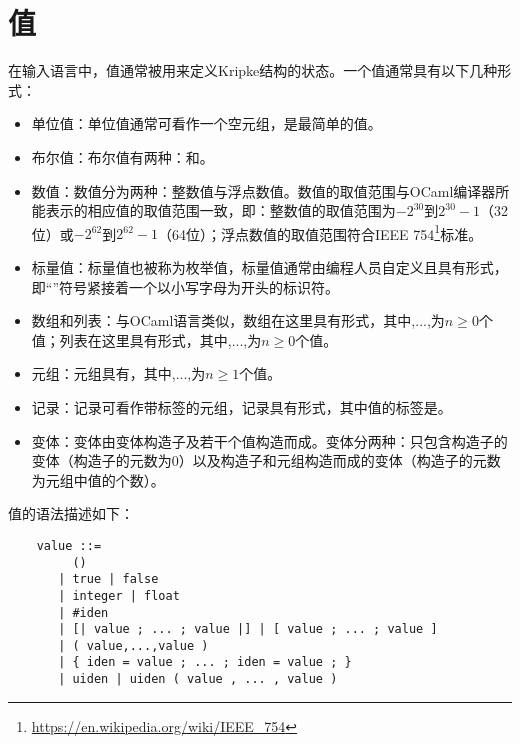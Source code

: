 \section{值}
在输入语言中，值通常被用来定义Kripke结构的状态。一个值通常具有以下几种形式：
\begin{itemize}
	\item 单位值：单位值\code{()}通常可看作一个空元组，是最简单的值。
	\item 布尔值：布尔值有两种：和。
	\item 数值：数值分为两种：整数值与浮点数值。数值的取值范围与OCaml编译器所能表示的相应值的取值范围一致，即：整数值的取值范围为$-2^{30}$到$2^{30}-1$（32位）或$-2^{62}$到$2^{62}-1$（64位）；浮点数值的取值范围符合IEEE 754\footnote{\url{https://en.wikipedia.org/wiki/IEEE_754}}标准。
	\item 标量值：标量值也被称为枚举值，标量值通常由编程人员自定义且具有形式，即“\code{\#}”符号紧接着一个以小写字母为开头的标识符。
	\item 数组和列表：与OCaml语言类似，数组在这里具有\code{[|v1,...,vn|]}形式，其中,...,为$n\ge 0$个值；列表在这里具有\code{[v1,...,vn]}形式，其中,...,为$n\ge 0$个值。
	\item 元组：元组具有，其中,...,为$n\ge 1$个值。
	\item 记录：记录可看作带标签的元组，记录具有形式，其中值的标签是。
	\item 变体：变体由变体构造子及若干个值构造而成。变体分两种：只包含构造子的变体（构造子的元数为0）以及构造子和元组构造而成的变体（构造子的元数为元组中值的个数）。
\end{itemize}
值的语法描述如下：
\begin{center}
	\begin{verbatim}
	value ::= 
	     ()
	   | true | false
	   | integer | float
	   | #iden
	   | [| value ; ... ; value |] | [ value ; ... ; value ]
	   | ( value,...,value )
	   | { iden = value ; ... ; iden = value ; }
	   | uiden | uiden ( value , ... , value )
	\end{verbatim}
\end{center}
